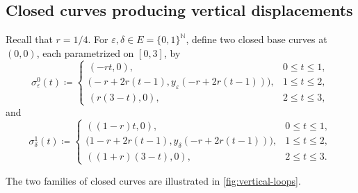 \documentclass[11pt]{amsart}
\numberwithin{equation}{section}
\theoremstyle{remark}
\newcommand{\N}{\mathbb N}
\begin{document}
\subsection{Closed curves producing vertical displacements}
Recall that $r=1/4$.  For $\varepsilon,\delta\in E=\{0,1\}^{\N}$,
define two closed base curves at $(0,0)$, each parametrized on $[0,3]$,
by
\begin{equation}
 \sigma^0_\varepsilon(t)\coloneq
 \begin{cases}
  (-rt,0),&0\leq t\leq1,\\
  \bigl(-r+2r(t-1),y_\varepsilon(-r+2r(t-1))\bigr),
       &1\leq t\leq2,\\
  (r(3-t),0),&2\leq t\leq3,
 \end{cases}
\end{equation}
and
\begin{equation}
 \sigma^1_\delta(t)\coloneq
 \begin{cases}
  ((1-r)t,0),&0\leq t\leq1,\\
  \bigl(1-r+2r(t-1),y_\delta(-r+2r(t-1))\bigr),
       &1\leq t\leq2,\\
  ((1+r)(3-t),0),&2\leq t\leq3.
 \end{cases}
\end{equation}

The two families of closed curves are illustrated in
\cref{fig:vertical-loops}.
\end{document}
